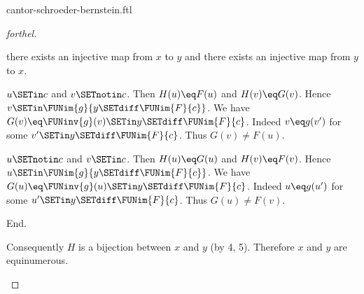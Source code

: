 \documentclass{article}
\begin{document}
\begin{smodule}{cantor-schroeder-bernstein.ftl}
\begin{proof}[forthel]
\begin{case}{there exists an injective map from $x$ to $y$ and there exists an injective map from $y$ to $x$.}
      \begin{case}{$u \SETin c$ and $v \SETnotin c$.}
        Then $H(u) \eq F(u)$ and $H(v) \eq G(v)$.
        Hence $v \SETin \FUNim{g}{y \SETdiff \FUNim{F}{c}}$.
        We have $G(v) \eq \FUNinv{g}(v) \SETin y \SETdiff \FUNim{F}{c}$.
        Indeed $v \eq g(v')$ for some $v' \SETin y \SETdiff \FUNim{F}{c}$.
        Thus $G(v) \neq F(u)$.
      \end{case}

      \begin{case}{$u \SETnotin c$ and $v \SETin c$.}
        Then $H(u) \eq G(u)$ and $H(v) \eq F(v)$.
        Hence $u \SETin \FUNim{g}{y \SETdiff \FUNim{F}{c}}$.
        We have $G(u) \eq \FUNinv{g}(u) \SETin y \SETdiff \FUNim{F}{c}$.
        Indeed $u \eq g(u')$ for some $u' \SETin y \SETdiff \FUNim{F}{c}$.
        Thus $G(u) \neq F(v)$.
      \end{case}
    End.

    Consequently $H$ is a bijection between $x$ and $y$ (by 4, 5).
    Therefore $x$ and $y$ are equinumerous.
  \end{case}
\end{proof}

\printbibliography
{}
\end{smodule}
\end{document}
